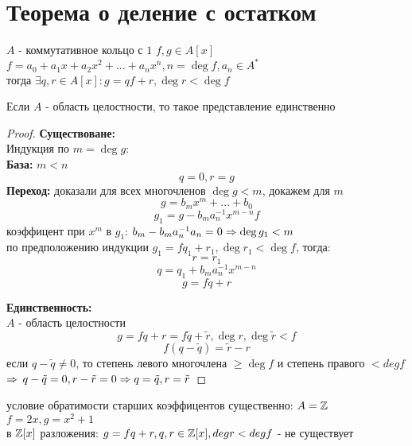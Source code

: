 \section{Теорема о деление с остатком}
\begin{theorem}{}
	$A$ - коммутативное кольцо с $1$
	$f, g \in A[x]$\\
	$f = a_0 + a_1x + a_2x^2 + ... + a_nx^n, n = \deg f, a_n \in A^*$\\
	тогда $\exists q, r \in A[x] :  g = qf + r, \deg r < \deg f$\\
\end{theorem}

\begin{Rem}
	Если $A$ - область целостности, то такое представление единственно\\
\end{Rem}

\begin{proof}
	\textbf{Существоване:}\\
	Индукция по $m = \deg g$:\\
	\textbf{База:} $m < n$\\
	$$ q = 0, r = g $$
	\textbf{Переход:} доказали для всех многочленов $\deg g < m$, докажем для $m$
	$$ g = b_mx^m + ... + b_0 $$
	$$ g_1 = g - b_m a_n^{-1}x^{m-n}f $$
	коэффицент при $x^m$ в $g_1$: $b_m - b_m a_n^{-1} a_n = 0 \Rightarrow \deg g_1 < m$\\
	по предположению индукции $g_1 = fq_1 + r_1, \deg r_1	< \deg f $, тогда:
		$$ r = r_1 $$
		$$ q = q_1 + b_m a_n^{-1} x^{m-n} $$
		$$ g = fq	+ r $$
		
	\textbf{Единственность:}\\
	$A$ - область целостности\\
	$$ g = fq + r = f \tilde{q} + \tilde{r}, \deg r, \deg \tilde{r} < f$$
	$$ f (q - \tilde{q}) = \tilde{r} - r $$
	если $q - \tilde{q} \neq 0$, то степень левого многочлена $\geq \deg f$ и степень правого $< deg f$ $\Rightarrow$ 
	$q -\tilde{q} = 0, r - \tilde{r} = 0 \Rightarrow q = \tilde{q}, r = \tilde{r}$
\end{proof}

\begin{Rem}
	условие обратимости старших коэффицентов существенно:
	$A = \mathbb{Z}$\\
	$f = 2x, g = x^2 + 1$\\
	в $\mathbb{Z}[x]$ разложения: $g = fq + r, q, r \in \mathbb{Z}[x], deg r < deg f$ - не существует
\end{Rem}
